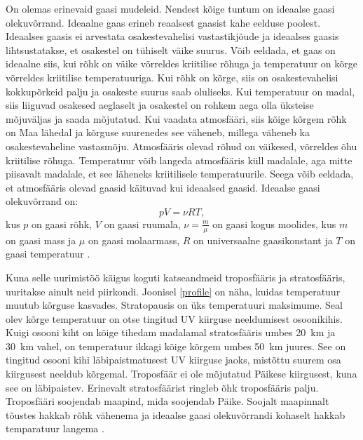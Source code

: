 \documentclass{trkut}%
\begin{document}
On olemas erinevaid gaasi mudeleid. Nendest kõige tuntum on ideaalse gaasi olekuvõrrand. Ideaalne gaas erineb reaalsest gaasist kahe eelduse poolest. Ideaalses gaasis ei arvestata osakestevahelisi vastastikjõude ja ideaalses gaasis lihtsustatakse, et osakestel on tühiselt väike suurus. Võib eeldada, et gaas on ideaalne siis, kui rõhk on väike võrreldes kriitilise rõhuga ja temperatuur on kõrge võrreldes kriitilise temperatuuriga. Kui rõhk on kõrge, siis on osakestevahelisi kokkupõrkeid palju ja osakeste suurus saab oluliseks. Kui temperatuur on madal, siis liiguvad osakesed aeglaselt ja osakestel on rohkem aega olla üksteise mõjuväljas ja saada mõjutatud. Kui vaadata atmosfääri, siis kõige kõrgem rõhk on Maa lähedal ja kõrguse suurenedes see väheneb, millega väheneb ka osakestevaheline vastasmõju. Atmosfääris olevad rõhud on väikesed, võrreldes õhu kriitilise rõhuga. Temperatuur võib langeda atmosfääris küll madalale, aga mitte piisavalt madalale, et see läheneks kriitilisele temperatuurile. Seega võib eeldada, et atmosfääris olevad gaasid käituvad kui ideaalsed gaasid. Ideaalse gaasi olekuvõrrand on:
\begin{equation}\label{eq8}
pV=\nu RT ,
\end{equation}
kus $p$ on gaasi rõhk, $V$ on gaasi ruumala, $\nu = \frac{m}{\mu}$ on gaasi kogus moolides, kus $m$ on gaasi mass ja $\mu$ on gaasi molaarmass, $R$ on universaalne gaasikonstant ja $T$ on gaasi temperatuur \parencite{IGasKhan}.


Kuna selle uurimistöö käigus koguti katseandmeid troposfääris ja stratosfääris, uuritakse ainult neid piirkondi. Joonisel \ref{profile} on näha, kuidas temperatuur muutub kõrguse kasvades. Stratopausis on üks temperatuuri maksimume. Seal olev kõrge temperatuur on otse tingitud UV kiirguse neeldumisest osoonikihis. Kuigi osooni kiht on kõige tihedam madalamal stratosfääris umbes \SI{20}{km} ja \SI{30}{km} vahel, on temperatuur ikkagi kõige kõrgem umbes \SI{50}{km} juures. See on tingitud osooni kihi läbipaistmatusest UV kiirguse jaoks, mistõttu suurem osa kiirgusest neeldub kõrgemal. Troposfäär ei ole mõjutatud Päikese kiirgusest, kuna see on läbipaistev. Erinevalt stratosfäärist ringleb õhk troposfääris palju. Troposfääri soojendab maapind, mida soojendab Päike. Soojalt maapinnalt tõustes hakkab rõhk vähenema ja ideaalse gaasi olekuvõrrandi kohaselt hakkab temparatuur langema \parencite[25--26]{book:779878}.
\end{document}
